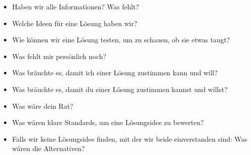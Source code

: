 \begin{itemize}
  \item Haben wir alle Informationen? Was fehlt?
  \item Welche Ideen für eine Lösung haben wir?
  \item Wie können wir eine Lösung testen, um zu schauen, ob sie etwas taugt?
  \item Was fehlt mir persönlich noch?
  \item Was bräuchte es, damit ich einer Lösung zustimmen kann und will?
  \item Was bräuchte es, damit du einer Lösung zustimmen kannst und willst?
  \item Was wäre dein Rat?
  \item Was wären klare Standards, um eine Lösungsidee zu bewerten?
  \item Falls wir keine Lösungsidee finden, mit der wir beide einverstanden sind: Was wären die Alternativen?
\end{itemize}

